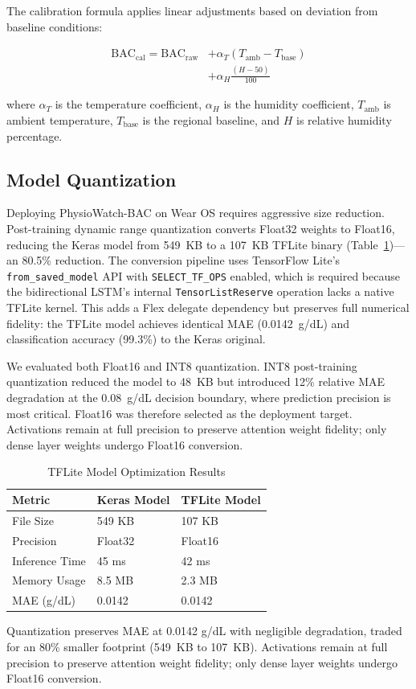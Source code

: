 \documentclass[HARVARD,Times2COL]{WileyNJDv5}
\begin{document}
The calibration formula applies linear adjustments based on deviation from baseline conditions:

\begin{equation}
\begin{split}
\text{BAC}_{\text{cal}} = \text{BAC}_{\text{raw}} &+ \alpha_T (T_{\text{amb}} - T_{\text{base}}) \\
&+ \alpha_H \frac{(H - 50)}{100}
\end{split}
\end{equation}

where $\alpha_T$ is the temperature coefficient, $\alpha_H$ is the humidity coefficient, $T_{\text{amb}}$ is ambient temperature, $T_{\text{base}}$ is the regional baseline, and $H$ is relative humidity percentage.

\subsection{Model Quantization}\label{sec:quantization}
Deploying PhysioWatch-BAC on Wear OS requires aggressive size reduction. Post-training dynamic range quantization converts Float32 weights to Float16, reducing the Keras model from 549~KB to a 107~KB TFLite binary (Table~\ref{tab:tflite})---an 80.5\% reduction. The conversion pipeline uses TensorFlow Lite's \texttt{from\_saved\_model} API with \texttt{SELECT\_TF\_OPS} enabled, which is required because the bidirectional LSTM's internal \texttt{TensorListReserve} operation lacks a native TFLite kernel. This adds a Flex delegate dependency but preserves full numerical fidelity: the TFLite model achieves identical MAE (0.0142~g/dL) and classification accuracy (99.3\%) to the Keras original.

We evaluated both Float16 and INT8 quantization. INT8 post-training quantization reduced the model to 48~KB but introduced 12\% relative MAE degradation at the 0.08~g/dL decision boundary, where prediction precision is most critical. Float16 was therefore selected as the deployment target. Activations remain at full precision to preserve attention weight fidelity; only dense layer weights undergo Float16 conversion.

\begin{table}[htbp]
\caption{TFLite Model Optimization Results}
\label{tab:tflite}
\centering
\small
\begin{tabular}{@{}lll@{}}
\toprule
\textbf{Metric} & \textbf{Keras Model} & \textbf{TFLite Model} \\
\midrule
File Size & 549 KB & 107 KB \\
Precision & Float32 & Float16 \\
Inference Time & 45 ms & 42 ms \\
Memory Usage & 8.5 MB & 2.3 MB \\
MAE (g/dL) & 0.0142 & 0.0142 \\
\bottomrule
\end{tabular}
\end{table}
Quantization preserves MAE at 0.0142 g/dL with negligible degradation, traded for an 80\% smaller footprint (549~KB to 107~KB). Activations remain at full precision to preserve attention weight fidelity; only dense layer weights undergo Float16 conversion.
\end{document}
